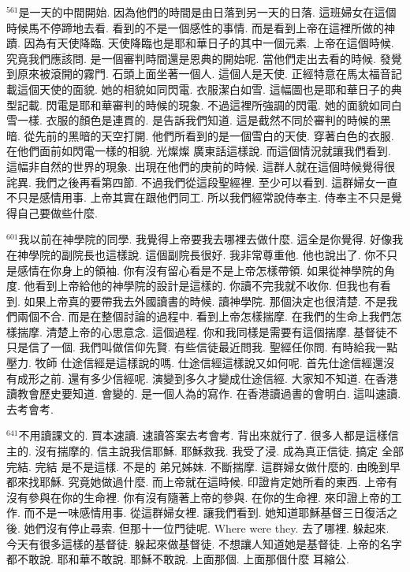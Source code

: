 \documentclass{book}
\begin{document}
$^{561}$是一天的中間開始.
因為他們的時間是由日落到另一天的日落.
這班婦女在這個時候馬不停蹄地去看.
看到的不是一個感性的事情.
而是看到上帝在這裡所做的神蹟.
因為有天使降臨.
天使降臨也是耶和華日子的其中一個元素.
上帝在這個時候.
究竟我們應該問.
是一個審判時間還是恩典的開始呢.
當他們走出去看的時候.
發覺到原來被滾開的霧門.
石頭上面坐著一個人.
這個人是天使.
正經特意在馬太福音記載這個天使的面貌.
她的相貌如同閃電.
衣服潔白如雪.
這幅圖也是耶和華日子的典型記載.
閃電是耶和華審判的時候的現象.
不過這裡所強調的閃電.
她的面貌如同白雪一樣.
衣服的顏色是連貫的.
是告訴我們知道.
這是截然不同於審判的時候的黑暗.
從先前的黑暗的天空打開.
他們所看到的是一個雪白的天使.
穿著白色的衣服.
在他們面前如閃電一樣的相貌.
光燦燦 廣東話這樣說.
而這個情況就讓我們看到.
這幅非自然的世界的現象.
出現在他們的庚前的時候.
這群人就在這個時候覺得很詫異.
我們之後再看第四節.
不過我們從這段聖經裡.
至少可以看到.
這群婦女一直不只是感情用事.
上帝其實在跟他們同工.
所以我們經常說侍奉主.
侍奉主不只是覺得自己要做些什麼.

$^{601}$我以前在神學院的同學.
我覺得上帝要我去哪裡去做什麼.
這全是你覺得.
好像我在神學院的副院長也這樣說.
這個副院長很好.
我非常尊重他.
他也說出了.
你不只是感情在你身上的領袖.
你有沒有留心看是不是上帝怎樣帶領.
如果從神學院的角度.
他看到上帝給他的神學院的設計是這樣的.
你讀不完我就不收你.
但我也有看到.
如果上帝真的要帶我去外國讀書的時候.
讀神學院.
那個決定也很清楚.
不是我們兩個不合.
而是在整個討論的過程中.
看到上帝怎樣揣摩.
在我們的生命上我們怎樣揣摩.
清楚上帝的心思意念.
這個過程.
你和我同樣是需要有這個揣摩.
基督徒不只是信了一個.
我們叫做信仰先賢.
有些信徒最近問我.
聖經任你問.
有時給我一點壓力.
牧師 仕途信經是這樣說的嗎.
仕途信經這樣說又如何呢.
首先仕途信經還沒有成形之前.
還有多少信經呢.
演變到多久才變成仕途信經.
大家知不知道.
在香港讀教會歷史要知道.
會變的.
是一個人為的寫作.
在香港讀過書的會明白.
這叫速讀.
去考會考.

$^{641}$不用讀課文的.
買本速讀.
速讀答案去考會考.
背出來就行了.
很多人都是這樣信主的.
沒有揣摩的.
信主說我信耶穌.
耶穌救我.
我受了浸.
成為真正信徒.
搞定 全部完結.
完結 是不是這樣.
不是的 弟兄姊妹.
不斷揣摩.
這群婦女做什麼的.
由晚到早都來找耶穌.
究竟她做過什麼.
而上帝就在這時候.
印證肯定她所看的東西.
上帝有沒有參與在你的生命裡.
你有沒有隨著上帝的參與.
在你的生命裡.
來印證上帝的工作.
而不是一味感情用事.
從這群婦女裡.
讓我們看到.
她知道耶穌基督三日復活之後.
她們沒有停止尋索.
但那十一位門徒呢.
Where were they.
去了哪裡.
躲起來.
今天有很多這樣的基督徒.
躲起來做基督徒.
不想讓人知道她是基督徒.
上帝的名字都不敢說.
耶和華不敢說.
耶穌不敢說.
上面那個.
上面那個什麼 耳縮公.
\end{document}

